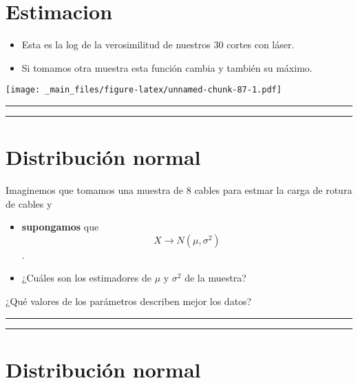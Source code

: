 \documentclass[
]{book}
\begin{document}
\hypertarget{estimacion-1}{%
\section{Estimacion}\label{estimacion-1}}

\begin{itemize}
\item
  Esta es la log de la verosimilitud de nuestros 30 cortes con láser.
\item
  Si tomamos otra muestra esta función cambia y también su máximo.
\end{itemize}

\texttt{[image: \_main\_files/figure-latex/unnamed-chunk-87-1.pdf]}

\begin{center}\rule{0.5\linewidth}{0.5pt}\end{center}

\begin{center}\rule{0.5\linewidth}{0.5pt}\end{center}

\hypertarget{distribuciuxf3n-normal-9}{%
\section{Distribución normal}\label{distribuciuxf3n-normal-9}}

Imaginemos que tomamos una muestra de \(8\) cables para estmar la carga de rotura de cables y

\begin{itemize}
\item
  \textbf{supongamos} que \[X \rightarrow N(\mu, \sigma^2)\].
\item
  ¿Cuáles son los estimadores de \(\mu\) y \(\sigma^2\) de la muestra?
\end{itemize}

¿Qué valores de los parámetros describen mejor los datos?

\begin{center}\rule{0.5\linewidth}{0.5pt}\end{center}

\begin{center}\rule{0.5\linewidth}{0.5pt}\end{center}

\hypertarget{distribuciuxf3n-normal-10}{%
\section{Distribución normal}\label{distribuciuxf3n-normal-10}}
\end{document}
